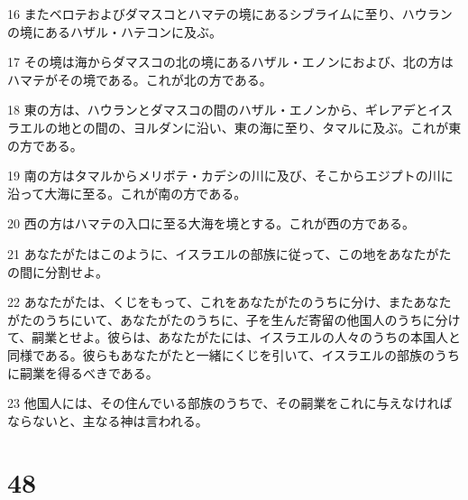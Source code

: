 \par 16 またベロテおよびダマスコとハマテの境にあるシブライムに至り、ハウランの境にあるハザル・ハテコンに及ぶ。
\par 17 その境は海からダマスコの北の境にあるハザル・エノンにおよび、北の方はハマテがその境である。これが北の方である。
\par 18 東の方は、ハウランとダマスコの間のハザル・エノンから、ギレアデとイスラエルの地との間の、ヨルダンに沿い、東の海に至り、タマルに及ぶ。これが東の方である。
\par 19 南の方はタマルからメリボテ・カデシの川に及び、そこからエジプトの川に沿って大海に至る。これが南の方である。
\par 20 西の方はハマテの入口に至る大海を境とする。これが西の方である。
\par 21 あなたがたはこのように、イスラエルの部族に従って、この地をあなたがたの間に分割せよ。
\par 22 あなたがたは、くじをもって、これをあなたがたのうちに分け、またあなたがたのうちにいて、あなたがたのうちに、子を生んだ寄留の他国人のうちに分けて、嗣業とせよ。彼らは、あなたがたには、イスラエルの人々のうちの本国人と同様である。彼らもあなたがたと一緒にくじを引いて、イスラエルの部族のうちに嗣業を得るべきである。
\par 23 他国人には、その住んでいる部族のうちで、その嗣業をこれに与えなければならないと、主なる神は言われる。

\chapter{48}

